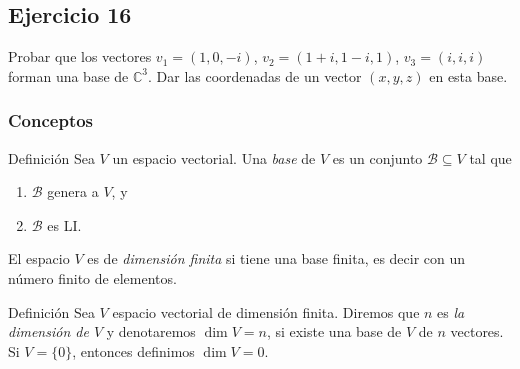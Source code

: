 \documentclass[a4paper,12pt]{article}
\begin{document}
\subsection{Ejercicio 16}
Probar que los vectores $v_1=(1,0,-i)$, $v_2=(1+i,1-i,1)$, $v_3=(i,i,i)$ forman una base de $\mathbb{C}^3$. Dar las coordenadas de un vector $(x,y,z)$ en esta base. 
\subsubsection{Conceptos}
\begin{defbox}{Definición}
    Sea $V$ un espacio vectorial. Una \textit{base} de $V$ es un conjunto $\mathcal{B} \subseteq V$ tal que
     \begin{enumerate}
         \item $\mathcal{B}$ genera a $V$, y
         \item $\mathcal{B}$ es LI.
     \end{enumerate}
      El espacio $V$ es de \textit{dimensión finita} si tiene una base finita,  es decir con  un número finito de elementos.
\end{defbox}
\begin{defbox}{Definición}
    Sea $V$ espacio vectorial de dimensión finita. Diremos que $n$  es \textit{la dimensión de $V$} y  denotaremos $\dim V =n$,  si existe una base de $V$  de $n$  vectores. Si $V = \{0\}$,  entonces definimos $\dim V =0$.
\end{defbox}
\end{document}
